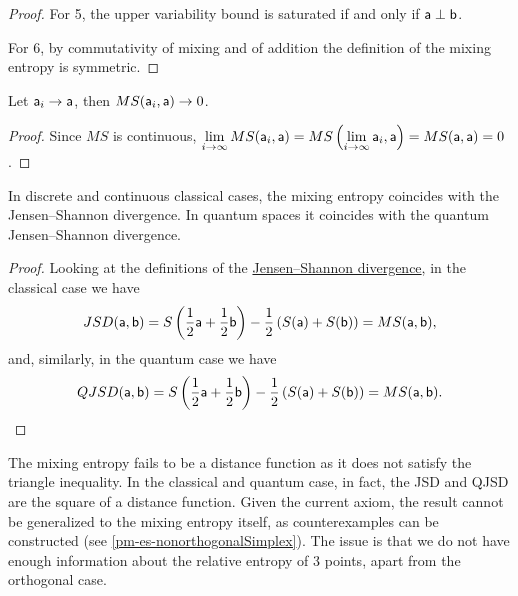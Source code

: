 \begin{mathSection}
\begin{proof}
	For 5, the upper variability bound is saturated if and only if $\ens[a] \ortho \ens[b]$.
	
	For 6, by commutativity of mixing and of addition the definition of the mixing entropy is symmetric.
\end{proof}

\begin{coro}\label{pm-es-mixingEntropyConverge}
	Let $\ens[a]_i \to \ens[a]$, then $MS(\ens[a]_i, \ens[a]) \to 0$.
\end{coro}

\begin{proof}
	Since $MS$ is continuous, $\lim\limits_{i \to \infty} MS(\ens[a]_i, \ens[a]) = MS\left(\lim\limits_{i \to \infty} \ens[a]_i, \ens[a]\right) = MS(\ens[a], \ens[a]) = 0$.
\end{proof}

\begin{prop}
	In discrete and continuous classical cases, the mixing entropy coincides with the Jensen--Shannon divergence. In quantum spaces it coincides with the quantum Jensen--Shannon divergence.
\end{prop}

\begin{proof}
	Looking at the definitions of the \href{https://en.wikipedia.org/wiki/Jensen%E2%80%93Shannon_divergence}{Jensen--Shannon divergence}, in the classical case we have
	$$ JSD(\ens[a], \ens[b]) = S\left(\frac{1}{2}\ens[a] + \frac{1}{2}\ens[b] \right)  - \frac{1}{2} \left(S(\ens[a]) + S(\ens[b])\right) = MS(\ens[a], \ens[b]),$$
	and, similarly, in the quantum case we have
	$$ QJSD(\ens[a], \ens[b]) = S\left(\frac{1}{2}\ens[a] + \frac{1}{2}\ens[b] \right)  - \frac{1}{2} \left(S(\ens[a]) + S(\ens[b])\right) = MS(\ens[a], \ens[b]).$$
\end{proof}

\begin{remark}
	The mixing entropy fails to be a distance function as it does not satisfy the triangle inequality. In the classical and quantum case, in fact, the JSD and QJSD are the square of a distance function. Given the current axiom, the result cannot be generalized to the mixing entropy itself, as counterexamples can be constructed (see \ref{pm-es-nonorthogonalSimplex}). The issue is that we do not have enough information about the relative entropy of 3 points, apart from the orthogonal case.
	

\end{remark}
\end{mathSection}
